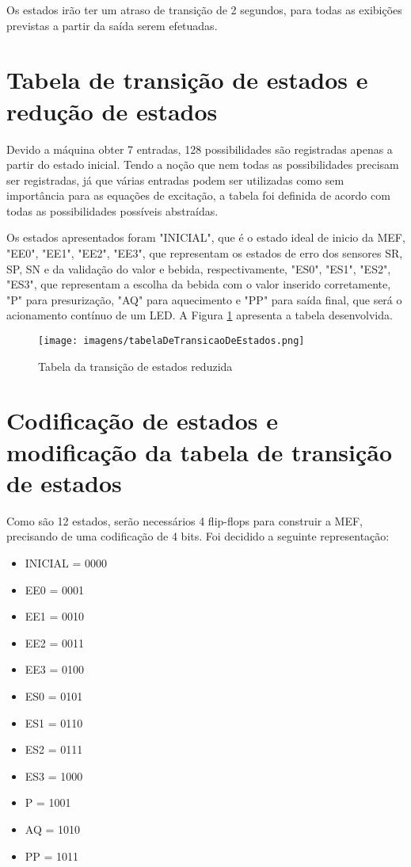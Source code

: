Os estados irão ter um atraso de transição de 2 segundos, para todas as exibições previstas a partir da saída serem efetuadas.

\section{Tabela de transição de estados e redução de estados}

Devido a máquina obter 7 entradas, 128 possibilidades são registradas apenas a partir do estado inicial. Tendo a noção que nem todas as possibilidades precisam ser registradas, já que várias entradas podem ser utilizadas como sem importância para as equações de excitação, a tabela foi definida de acordo com todas as possibilidades possíveis abstraídas. 

Os estados apresentados foram "INICIAL", que é o estado ideal de inicio da MEF, "EE0", "EE1", "EE2", "EE3", que representam os estados de erro dos sensores SR, SP, SN e da validação do valor e bebida, respectivamente, "ES0", "ES1", "ES2", "ES3", que representam a escolha da bebida com o valor inserido corretamente, "P" para presurização, "AQ" para aquecimento e "PP" para saída final, que será o acionamento contínuo de um LED. A Figura \ref{fig:tabelaTransicao} apresenta a tabela desenvolvida.

\begin{figure}[]
    \centering
    \texttt{[image: imagens/tabelaDeTransicaoDeEstados.png]}
    \caption{Tabela da transição de estados reduzida}
    \label{fig:tabelaTransicao}
\end{figure}

\section{Codificação de estados e modificação da tabela de transição de estados}

Como são 12 estados, serão necessários 4 flip-flops para construir a MEF, precisando de uma codificação de 4 bits. Foi decidido a seguinte representação:

\begin{itemize}
    \item INICIAL = 0000
    \item EE0 = 0001
    \item EE1 = 0010
    \item EE2 = 0011
    \item EE3 = 0100
    \item ES0 = 0101
    \item ES1 = 0110
    \item ES2 = 0111
    \item ES3 = 1000
    \item P = 1001
    \item AQ = 1010
    \item PP = 1011
\end{itemize}

